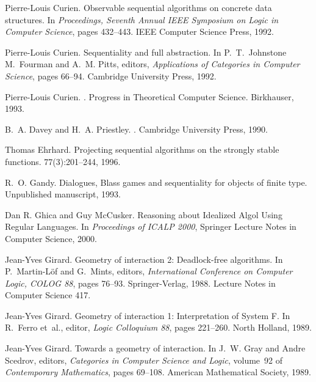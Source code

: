 \documentclass[11pt]{article}
\begin{document}
\begin{thebibliography}{Cur92b}
Pierre-Louis Curien.
\newblock Observable sequential algorithms on concrete data structures.
\newblock In {\em Proceedings, {S}eventh {A}nnual {IEEE} {S}ymposium on {L}ogic
  in {C}omputer {S}cience}, pages 432--443. IEEE {C}omputer {S}cience {P}ress,
  1992.

Pierre-Louis Curien.
\newblock Sequentiality and full abstraction.
\newblock In P.~T.~Johnstone M.~Fourman and A.~M. Pitts, editors, {\em
  Applications of Categories in Computer Science}, pages 66--94. Cambridge
  University Press, 1992.

Pierre-Louis Curien.
.
\newblock Progress in Theoretical Computer Science. Birkhauser, 1993.

B.~A. Davey and H.~A. Priestley.
.
\newblock Cambridge University Press, 1990.

Thomas Ehrhard.
\newblock Projecting sequential algorithms on the strongly stable functions.
77(3):201--244, 1996.

R.~O. Gandy.
\newblock Dialogues, {B}lass games and sequentiality for objects of finite
  type.
\newblock Unpublished manuscript, 1993.

Dan R. Ghica and Guy McCusker.
\newblock Reasoning about Idealized Algol Using Regular Languages.
\newblock In {\em Proceedings of ICALP 2000}, Springer Lecture Notes in
Computer Science, 2000.

Jean-Yves Girard.
\newblock Geometry of interaction 2: Deadlock-free algorithms.
\newblock In P.~Martin-L\"{o}f and G.~Mints, editors, {\em International
  Conference on Computer Logic, {COLOG} 88}, pages 76--93. Springer-Verlag,
  1988.
\newblock Lecture Notes in Computer Science 417.

Jean-Yves Girard.
\newblock Geometry of interaction 1: Interpretation of {S}ystem {F}.
\newblock In R.~Ferro et~al., editor, {\em Logic Colloquium 88}, pages
  221--260. North Holland, 1989.

Jean-Yves Girard.
\newblock Towards a geometry of interaction.
\newblock In J.~W. Gray and Andre Scedrov, editors, {\em Categories in Computer
  Science and Logic}, volume~92 of {\em Contemporary Mathematics}, pages
  69--108. American Mathematical Society, 1989.


\end{thebibliography}
\end{document}
